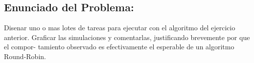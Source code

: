 \subsection{Enunciado del Problema:}

Disenar uno o mas lotes de tareas para ejecutar con el algoritmo del ejercicio anterior. Graficar las simulaciones y comentarlas, justificando brevemente por que el compor- tamiento observado es efectivamente el esperable de un algoritmo Round-Robin.